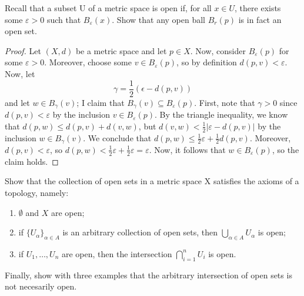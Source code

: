 \documentclass[./main.tex]{subfiles}
\begin{document}
\begin{fprob}
    Recall that a subset U of a metric space is open if, for all $x\in U$, there exists some
    $\varepsilon >0$ such that $B_{\varepsilon}(x)$. Show that any open ball $B_r(p)$ is in fact an open set.
\end{fprob}
\begin{proof}
    Let $(X,d)$ be a metric space and let $p\in X$. Now, consider $B_\varepsilon(p)$ for some $\varepsilon>0$.
    Moreover, choose some $v\in B_\varepsilon(p)$, so by definition $d(p,v)<\varepsilon$. Now, let
    \[
        \gamma = \frac{1}{2}(\epsilon-d(p,v))
    \]
    and let $w\in B_\gamma(v)$; I claim that $B_\gamma(v)\subseteq B_\varepsilon(p)$. First, note that $\gamma>0$ since 
    $d(p,v)<\varepsilon$ by the inclusion $v\in B_\varepsilon(p)$. By the triangle inequality, we know that 
    $d(p,w)\leq d(p,v)+d(v,w)$, but $d(v,w)<\frac{1}{2}|\varepsilon-d(p,v)|$ by the inclusion $w\in B_\gamma(v)$. 
    We conclude that $d(p,w)\leq \frac{1}{2}\varepsilon+\frac{1}{2}d(p,v)$. Moreover, $d(p,v)<\varepsilon$, so 
    $d(p,w)<\frac{1}{2}\varepsilon+\frac{1}{2}\varepsilon=\varepsilon$. Now, it follows that $w\in B_\varepsilon(p)$, 
    so the claim holds. 
\end{proof}

\begin{fprob}
    Show that the collection of open sets in a metric space X satisfies the axioms of a topology, namely:
    \begin{enumerate}
        \item $\emptyset$ and $X$ are open;
        \item if $\{U_\alpha\}_{\alpha\in A}$ is an arbitrary collection of open sets, 
        then $\bigcup_{\alpha\in A}U_\alpha$ is open;
        \item if $U_1, \dots, U_n$ are open, then the intersection $\bigcap_{i=1}^nU_i$ is open.
    \end{enumerate}
    Finally, show with three examples that the arbitrary intersection of open sets is not necesarily open.
\end{fprob}
\end{document}
